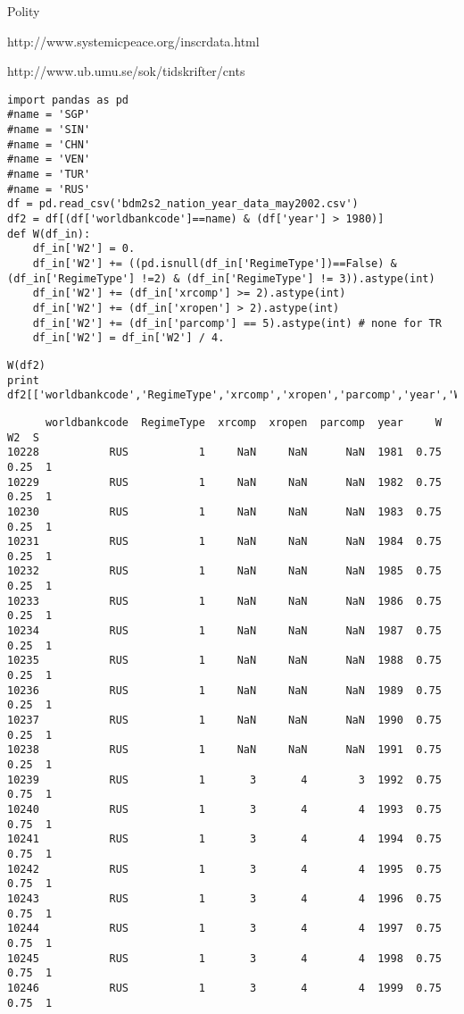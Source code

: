 \documentclass[12pt,fleqn]{article}\usepackage{common}
\begin{document}
Polity

http://www.systemicpeace.org/inscrdata.html

http://www.ub.umu.se/sok/tidskrifter/cnts

\begin{verbatim}
import pandas as pd
#name = 'SGP'
#name = 'SIN'
#name = 'CHN'
#name = 'VEN'
#name = 'TUR'
#name = 'RUS'
df = pd.read_csv('bdm2s2_nation_year_data_may2002.csv')
df2 = df[(df['worldbankcode']==name) & (df['year'] > 1980)]
def W(df_in):
    df_in['W2'] = 0.
    df_in['W2'] += ((pd.isnull(df_in['RegimeType'])==False) & (df_in['RegimeType'] !=2) & (df_in['RegimeType'] != 3)).astype(int)
    df_in['W2'] += (df_in['xrcomp'] >= 2).astype(int)
    df_in['W2'] += (df_in['xropen'] > 2).astype(int)
    df_in['W2'] += (df_in['parcomp'] == 5).astype(int) # none for TR
    df_in['W2'] = df_in['W2'] / 4.
\end{verbatim}

\begin{verbatim}
W(df2)
print df2[['worldbankcode','RegimeType','xrcomp','xropen','parcomp','year','W','W2','S']]
\end{verbatim}

\begin{verbatim}
      worldbankcode  RegimeType  xrcomp  xropen  parcomp  year     W    W2  S
10228           RUS           1     NaN     NaN      NaN  1981  0.75  0.25  1
10229           RUS           1     NaN     NaN      NaN  1982  0.75  0.25  1
10230           RUS           1     NaN     NaN      NaN  1983  0.75  0.25  1
10231           RUS           1     NaN     NaN      NaN  1984  0.75  0.25  1
10232           RUS           1     NaN     NaN      NaN  1985  0.75  0.25  1
10233           RUS           1     NaN     NaN      NaN  1986  0.75  0.25  1
10234           RUS           1     NaN     NaN      NaN  1987  0.75  0.25  1
10235           RUS           1     NaN     NaN      NaN  1988  0.75  0.25  1
10236           RUS           1     NaN     NaN      NaN  1989  0.75  0.25  1
10237           RUS           1     NaN     NaN      NaN  1990  0.75  0.25  1
10238           RUS           1     NaN     NaN      NaN  1991  0.75  0.25  1
10239           RUS           1       3       4        3  1992  0.75  0.75  1
10240           RUS           1       3       4        4  1993  0.75  0.75  1
10241           RUS           1       3       4        4  1994  0.75  0.75  1
10242           RUS           1       3       4        4  1995  0.75  0.75  1
10243           RUS           1       3       4        4  1996  0.75  0.75  1
10244           RUS           1       3       4        4  1997  0.75  0.75  1
10245           RUS           1       3       4        4  1998  0.75  0.75  1
10246           RUS           1       3       4        4  1999  0.75  0.75  1
\end{verbatim}
\end{document}
